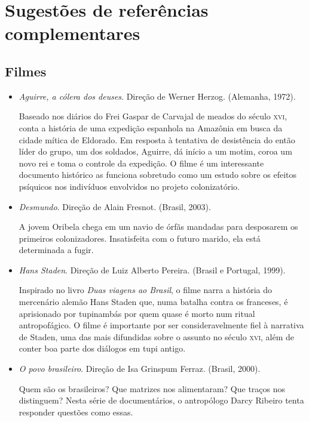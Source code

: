 \documentclass[12pt]{extarticle}
\begin{document}
{\section{Sugestões de referências complementares}\label{sugestoes}

\subsection{Filmes} 
\begin{itemize}

	\item \emph{Aguirre, a cólera dos deuses}. Direção de Werner Herzog. 
	(Alemanha, 1972).

	Baseado nos diários do Frei Gaspar de Carvajal de meados do século 
	\textsc{xvi}, conta a história de uma expedição espanhola na Amazônia 
	em busca da cidade mítica de Eldorado. Em resposta à tentativa de 
	desistência do então líder do grupo, um dos	soldados, Aguirre, dá 
	início a um motim, coroa um novo rei e toma o controle da expedição. 
	O filme é um interessante documento histórico as funciona sobretudo 
	como um estudo sobre os efeitos psíquicos nos indivíduos envolvidos 
	no projeto colonizatório.

	\item \emph{Desmundo}. Direção de Alain Fresnot. (Brasil, 2003).

	A jovem Oribela chega em um navio de órfãs mandadas para desposarem os
	primeiros colonizadores. Insatisfeita com o futuro marido, ela está
	determinada a fugir.

	\item \emph{Hans Staden}. Direção de Luiz Alberto Pereira. (Brasil e 
	Portugal, 1999).

	Inspirado no livro \emph{Duas viagens ao Brasil}, o filme narra a história
	do mercenário alemão Hans Staden que, numa batalha contra os franceses,
	é aprisionado por tupinambás por quem quase é morto num ritual antropofágico.
	O filme é importante por ser consideravelmente fiel à narrativa de
	Staden, uma das mais difundidas sobre o assunto no século \textsc{xvi},
	além de conter boa parte dos diálogos em tupi antigo.

	\item \emph{O povo brasileiro}. Direção de Isa Grinspum Ferraz. (Brasil, 2000).

	Quem são os brasileiros? Que matrizes nos alimentaram? Que traços nos
	distinguem? Nesta série de documentários, o antropólogo Darcy Ribeiro
	tenta responder questões como essas.


\end{itemize}}
\end{document}
